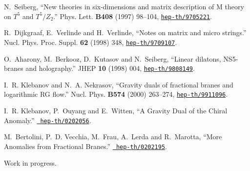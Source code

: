\documentclass[a4paper,11pt]{article}
\begin{document}
\begin{thebibliography}{10}
N.~Seiberg, ``New theories in six-dimensions and matrix description of {M}
  theory on {$T^5$} and {$T^5/Z_2$}.'' Phys. Lett. {\bf B408} (1997) 98--104,
  \href{http://xxx.lanl.gov/abs/hep-th/9705221}{{\tt hep-th/9705221}}.

R.~Dijkgraaf, E.~Verlinde and H.~Verlinde, ``Notes on matrix and micro
  strings.'' Nucl. Phys. Proc. Suppl. {\bf 62} (1998) 348,
  \href{http://xxx.lanl.gov/abs/hep-th/9709107}{{\tt hep-th/9709107}}.

O.~Aharony, M.~Berkooz, D.~Kutasov and N.~Seiberg, ``Linear dilatons,
  {NS5-branes} and holography.'' JHEP {\bf 10} (1998) 004,
  \href{http://xxx.lanl.gov/abs/hep-th/9808149}{{\tt hep-th/9808149}}.

I.~R. Klebanov and N.~A. Nekrasov, ``Gravity duals of fractional branes and
  logarithmic RG flow.'' Nucl. Phys. {\bf B574} (2000) 263--274,
  \href{http://xxx.lanl.gov/abs/hep-th/9911096}{{\tt hep-th/9911096}}.

I.~R. Klebanov, P.~Ouyang and E.~Witten, ``A Gravity Dual of the Chiral
  Anomaly.'' \href{http://xxx.lanl.gov/abs/hep-th/0202056}{{\tt
  hep-th/0202056}}. %

M.~Bertolini, P.~D. Vecchia, M.~Frau, A.~Lerda and R.~Marotta, ``More Anomalies
  from Fractional Branes.''
  \href{http://xxx.lanl.gov/abs/http://arXiv.org/abs/hep-th/0202195}{{\tt
  hep-th/0202195}}. %

 Work in progress.

\end{thebibliography}\endgroup
\end{document}
